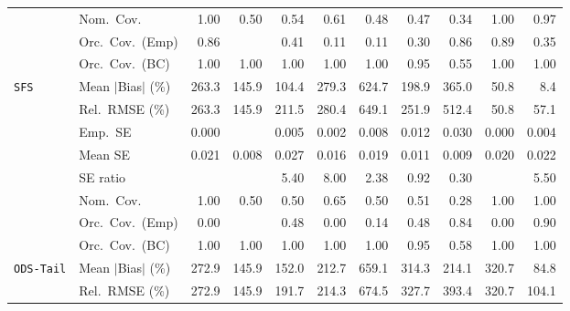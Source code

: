\begin{landscape}
\begin{longtable}{llrrrrrrrrr}
 & Nom.\ Cov. & \cellcolor{ranktwo}1.00 & 0.50 & 0.54 & \cellcolor{rankthree}0.61 & 0.48 & 0.47 & 0.34 & \cellcolor{ranktwo}1.00 & \cellcolor{rankone}0.97 \\
 & Orc.\ Cov.\ (Emp) & \cellcolor{ranktwo}0.86 &  & \cellcolor{rankthree}0.41 & 0.11 & 0.11 & 0.30 & \cellcolor{ranktwo}0.86 & \cellcolor{rankone}0.89 & 0.35 \\
 & Orc.\ Cov.\ (BC) & \cellcolor{ranktwo}1.00 & \cellcolor{ranktwo}1.00 & \cellcolor{ranktwo}1.00 & \cellcolor{ranktwo}1.00 & \cellcolor{ranktwo}1.00 & \cellcolor{rankone}0.95 & \cellcolor{rankthree}0.55 & \cellcolor{ranktwo}1.00 & \cellcolor{ranktwo}1.00 \\
\addlinespace[2pt]
\quad \texttt{SFS} & Mean $|$Bias$|$ (\%) & 263.3 & 145.9 & \cellcolor{rankthree}104.4 & 279.3 & 624.7 & 198.9 & 365.0 & \cellcolor{ranktwo}50.8 & \cellcolor{rankone}8.4 \\
 & Rel.\ RMSE (\%) & 263.3 & \cellcolor{rankthree}145.9 & 211.5 & 280.4 & 649.1 & 251.9 & 512.4 & \cellcolor{rankone}50.8 & \cellcolor{ranktwo}57.1 \\
 & Emp.\ SE & 0.000 &  & 0.005 & 0.002 & 0.008 & 0.012 & 0.030 & 0.000 & 0.004 \\
 & Mean SE & 0.021 & 0.008 & 0.027 & 0.016 & 0.019 & 0.011 & 0.009 & 0.020 & 0.022 \\
 & SE ratio &  &  & 5.40 & 8.00 & \cellcolor{rankthree}2.38 & \cellcolor{rankone}0.92 & \cellcolor{ranktwo}0.30 &  & 5.50 \\
 & Nom.\ Cov. & \cellcolor{rankone}1.00 & 0.50 & 0.50 & \cellcolor{ranktwo}0.65 & 0.50 & \cellcolor{rankthree}0.51 & 0.28 & \cellcolor{rankone}1.00 & \cellcolor{rankone}1.00 \\
 & Orc.\ Cov.\ (Emp) & 0.00 &  & \cellcolor{rankthree}0.48 & 0.00 & 0.14 & \cellcolor{rankthree}0.48 & \cellcolor{ranktwo}0.84 & 0.00 & \cellcolor{rankone}0.90 \\
 & Orc.\ Cov.\ (BC) & \cellcolor{ranktwo}1.00 & \cellcolor{ranktwo}1.00 & \cellcolor{ranktwo}1.00 & \cellcolor{ranktwo}1.00 & \cellcolor{ranktwo}1.00 & \cellcolor{rankone}0.95 & \cellcolor{rankthree}0.58 & \cellcolor{ranktwo}1.00 & \cellcolor{ranktwo}1.00 \\
\addlinespace[2pt]
\quad \texttt{ODS-Tail} & Mean $|$Bias$|$ (\%) & 272.9 & \cellcolor{ranktwo}145.9 & \cellcolor{rankthree}152.0 & 212.7 & 659.1 & 314.3 & 214.1 & 320.7 & \cellcolor{rankone}84.8 \\
 & Rel.\ RMSE (\%) & 272.9 & \cellcolor{ranktwo}145.9 & \cellcolor{rankthree}191.7 & 214.3 & 674.5 & 327.7 & 393.4 & 320.7 & \cellcolor{rankone}104.1 \\

\end{longtable}
\end{landscape}
